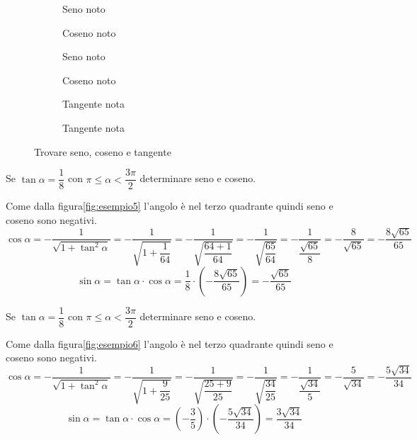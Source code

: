 \begin{figure}
\begin{subfigure}[b]{.5\linewidth}
\centering

\captionsetup{format=esempio}
\caption{Seno noto}\label{fig:esempio1}
\end{subfigure}%
\begin{subfigure}[b]{.5\linewidth}
\centering

\captionsetup{format=esempio}
\caption{Coseno noto}\label{fig:esempio2}
\end{subfigure}%
\quad
\begin{subfigure}[b]{.5\linewidth}
\centering

\captionsetup{format=esempio}
\caption{Seno noto}\label{fig:esempio3}
\end{subfigure}%
\begin{subfigure}[b]{.5\linewidth}
\centering

\captionsetup{format=esempio}
\caption{Coseno noto}\label{fig:esempio4}
\end{subfigure}%
\quad
\begin{subfigure}[b]{.5\linewidth}
	\centering
	
	\caption{Tangente nota}\label{fig:esempio5}
\end{subfigure}%
\begin{subfigure}[b]{.5\linewidth}
	\centering
	
	\caption{Tangente nota}\label{fig:esempio6}
\end{subfigure}%
\caption{Trovare seno, coseno e tangente}
\end{figure}
\begin{esempiot}{}{}
Se $\tan\alpha=\dfrac{1}{8}$ con $\pi\leq\alpha<\dfrac{3\pi}{2}$ determinare seno e coseno.
\end{esempiot}
Come dalla figura\nobs\vref{fig:esempio5} l'angolo è nel terzo quadrante quindi seno e coseno sono negativi.
\[\cos\alpha=-\dfrac{1}{\sqrt{1+\tan^2\alpha}}=-\dfrac{1}{\sqrt{1+\dfrac{1}{64}}}=-\dfrac{1}{\sqrt{\dfrac{64+1}{64}}}=-\dfrac{1}{\sqrt{\dfrac{65}{64}}}=-\dfrac{1}{\dfrac{\sqrt{65}}{8}}=-\dfrac{8}{\sqrt{65}}=-\dfrac{8\sqrt{65}}{65} \]
\[\sin\alpha=\tan\alpha\cdot\cos\alpha=\dfrac{1}{8}\cdot\left(-\dfrac{8\sqrt{65}}{65}\right)=-\dfrac{\sqrt{65}}{65} \]
\begin{esempiot}{}{}
	Se $\tan\alpha=\dfrac{1}{8}$ con $\pi\leq\alpha<\dfrac{3\pi}{2}$ determinare seno e coseno.
\end{esempiot}
Come dalla figura\nobs\vref{fig:esempio6} l'angolo è nel terzo quadrante quindi seno e coseno sono negativi.
\[\cos\alpha=-\dfrac{1}{\sqrt{1+\tan^2\alpha}}=-\dfrac{1}{\sqrt{1+\dfrac{9}{25}}}=-\dfrac{1}{\sqrt{\dfrac{25+9}{25}}}=-\dfrac{1}{\sqrt{\dfrac{34}{25}}}=-\dfrac{1}{\dfrac{\sqrt{34}}{5}}=-\dfrac{5}{\sqrt{34}}=-\dfrac{5\sqrt{34}}{34} \]
\[\sin\alpha=\tan\alpha\cdot\cos\alpha=\left(-\dfrac{3}{5}\right)\cdot\left(-\dfrac{5\sqrt{34}}{34}\right)=\dfrac{3\sqrt{34}}{34} \]
